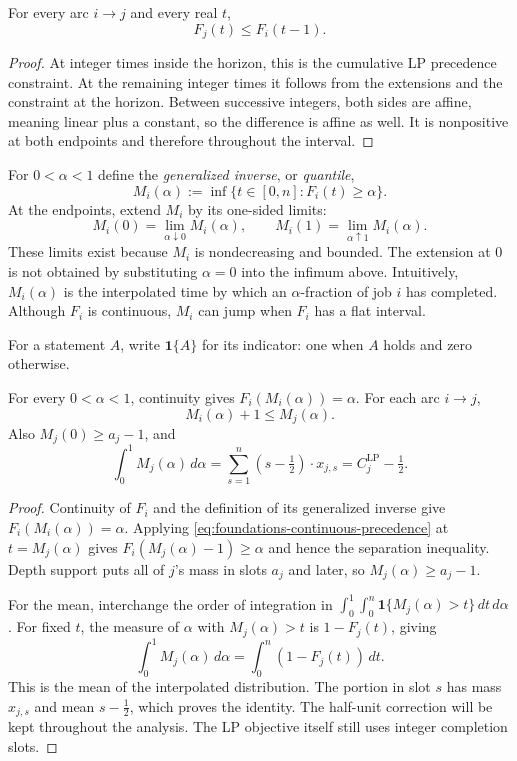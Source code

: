 \begin{lemma}
For every arc $i\to j$ and every real $t$,
\begin{equation}
 F_j(t)\le F_i(t-1).
 \label{eq:foundations-continuous-precedence}
\end{equation}
\end{lemma}
\begin{proof}
At integer times inside the horizon, this is the cumulative LP precedence
constraint. At the remaining integer times it follows from the extensions
and the constraint at the horizon. Between successive integers, both sides
are affine, meaning linear plus a constant, so the difference is affine as
well. It is nonpositive at both
endpoints and therefore throughout the interval.
\end{proof}

For $0<\alpha<1$ define the \emph{generalized inverse}, or \emph{quantile},
\[
 M_i(\alpha):=\inf\{t\in[0,n]:F_i(t)\ge\alpha\}.
\]
At the endpoints, extend $M_i$ by its one-sided limits:
\[
 M_i(0)=\lim_{\alpha\downarrow0}M_i(\alpha),\qquad
 M_i(1)=\lim_{\alpha\uparrow1}M_i(\alpha).
\]
These limits exist because $M_i$ is nondecreasing and bounded. The
extension at $0$ is not obtained by substituting $\alpha=0$ into the
infimum above. Intuitively, $M_i(\alpha)$ is the interpolated time by
which an $\alpha$-fraction of job $i$ has completed. Although $F_i$ is
continuous, $M_i$ can jump when $F_i$ has a flat interval.

For a statement $A$, write $\mathbf1\{A\}$ for its indicator: one when $A$
holds and zero otherwise.

\begin{lemma}
For every $0<\alpha<1$, continuity gives $F_i(M_i(\alpha))=\alpha$.
For each arc $i\to j$,
\begin{equation}
 M_i(\alpha)+1\le M_j(\alpha).
 \label{eq:foundations-quantile-separation}
\end{equation}
Also $M_j(0)\ge a_j-1$, and
\begin{equation}
 \int_0^1M_j(\alpha)\,d\alpha
   =\sum_{s=1}^n(s-\tfrac12)\cdot x_{j,s}
   =C_j^{\mathrm{LP}}-\tfrac12.
 \label{eq:foundations-quantile-mean}
\end{equation}
\end{lemma}
\begin{proof}
Continuity of $F_i$ and the definition of its generalized inverse give
$F_i(M_i(\alpha))=\alpha$. Applying \eqref{eq:foundations-continuous-precedence} at
$t=M_j(\alpha)$ gives $F_i(M_j(\alpha)-1)\ge\alpha$ and hence the
separation inequality. Depth support puts all of $j$'s mass in slots
$a_j$ and later, so $M_j(\alpha)\ge a_j-1$.

For the mean, interchange the order of integration in
$\int_0^1\int_0^n\mathbf1\{M_j(\alpha)>t\}\,dt\,d\alpha$. For fixed $t$,
the measure of $\alpha$ with $M_j(\alpha)>t$ is $1-F_j(t)$, giving
\[
 \int_0^1 M_j(\alpha)\,d\alpha
 =\int_0^n(1-F_j(t))\,dt.
\]
This is the mean of the interpolated distribution. The portion in slot $s$
has mass $x_{j,s}$ and mean $s-\tfrac12$, which proves the identity. The
half-unit correction will be kept throughout the analysis. The LP objective
itself still uses integer completion slots.
\end{proof}
